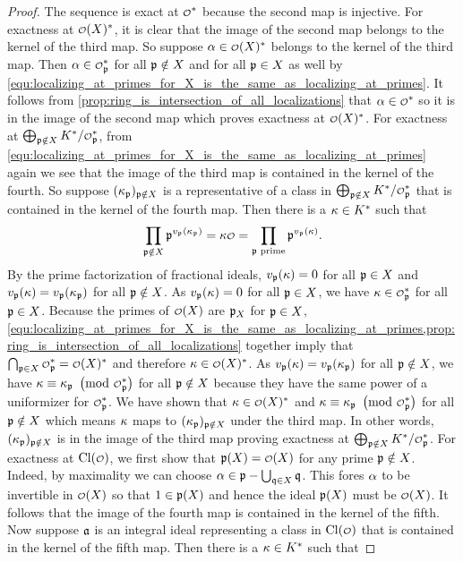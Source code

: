     \begin{proof}
      The sequence is exact at $\smc{O}^{\ast}$ because the second map is injective. For exactness at $\smc{O}(X)^{\ast}$, it is clear that the image of the second map belongs to the kernel of the third map. So suppose $\a \in \smc{O}(X)^{\ast}$ belongs to the kernel of the third map. Then $\a \in \smc{O}_{\mf{p}}^{\ast}$ for all $\mathfrak{p} \notin X$ and for all $\mathfrak{p} \in X$ as well by \cref{equ:localizing_at_primes_for_X_is_the_same_as_localizing_at_primes}. It follows from \cref{prop:ring_is_intersection_of_all_localizations} that $\a \in \smc{O}^{\ast}$ so it is in the image of the second map which proves exactness at $\smc{O}(X)^{\ast}$. For exactness at $\bigop_{\mf{p} \notin X}K^{\ast}/\smc{O}_{\mf{p}}^{\ast}$, from \cref{equ:localizing_at_primes_for_X_is_the_same_as_localizing_at_primes} again we see that the image of the third map is contained in the kernel of the fourth. So suppose $(\kappa_{\mathfrak{p}})_{\mathfrak{p} \notin X}$ is a representative of a class in $\bigop_{\mf{p} \notin X}K^{\ast}/\smc{O}_{\mf{p}}^{\ast}$ that is contained in the kernel of the fourth map. Then there is a $\kappa \in K^{\ast}$ such that
      \[
        \prod_{\mf{p} \notin X}\mf{p}^{v_{\mf{p}}(\k_{\mf{p}})} = \k\smc{O} = \prod_{\text{$\mf{p}$ prime}}\mf{p}^{v_{\mf{p}}(\k)}.
      \]
      By the prime factorization of fractional ideals, $v_{\mathfrak{p}}(\kappa) = 0$ for all $\mathfrak{p} \in X$ and $v_{\mathfrak{p}}(\kappa) = v_{\mathfrak{p}}(\kappa_{\mathfrak{p}})$ for all $\mathfrak{p} \notin X$. As $v_{\mathfrak{p}}(\kappa) = 0$ for all $\mathfrak{p} \in X$, we have $\k \in \smc{O}_{\mf{p}}^{\ast}$ for all $\mathfrak{p} \in X$. Because the primes of $\smc{O}(X)$ are $\mathfrak{p}_{X}$ for $\mathfrak{p} \in X$, \cref{equ:localizing_at_primes_for_X_is_the_same_as_localizing_at_primes,prop:ring_is_intersection_of_all_localizations} together imply that $\bigcap_{\mf{p} \in X}\smc{O}_{\mf{p}}^{\ast} = \smc{O}(X)^{\ast}$ and therefore $\k \in \smc{O}(X)^{\ast}$. As $v_{\mathfrak{p}}(\kappa) = v_{\mathfrak{p}}(\kappa_{\mathfrak{p}})$ for all $\mathfrak{p} \notin X$, we have $\k \equiv \k_{\mf{p}} \tmod{\smc{O}_{\mf{p}}^{\ast}}$ for all $\mathfrak{p} \notin X$ because they have the same power of a uniformizer for $\smc{O}_{\mf{p}}^{\ast}$. We have shown that $\k \in \smc{O}(X)^{\ast}$ and $\k \equiv \k_{\mf{p}} \tmod{\smc{O}_{\mf{p}}^{\ast}}$ for all $\mathfrak{p} \notin X$ which means $\kappa$ maps to $(\kappa_{\mathfrak{p}})_{\mathfrak{p} \notin X}$ under the third map. In other words, $(\kappa_{\mathfrak{p}})_{\mathfrak{p} \notin X}$ is in the image of the third map proving exactness at $\bigop_{\mf{p} \notin X}K^{\ast}/\smc{O}_{\mf{p}}^{\ast}$. For exactness at $\Cl(\smc{O})$, we first show that $\mf{p}(X) = \smc{O}(X)$ for any prime $\mathfrak{p} \notin X$. Indeed, by maximality we can choose $\alpha \in \mathfrak{p}-\bigcup_{\mathfrak{q} \in X}\mathfrak{q}$. This fores $\alpha$ to be invertible in $\smc{O}(X)$ so that $1 \in \mathfrak{p}(X)$ and hence the ideal $\mathfrak{p}(X)$ must be $\smc{O}(X)$. It follows that the image of the fourth map is contained in the kernel of the fifth. Now suppose $\mathfrak{a}$ is an integral ideal representing a class in $\Cl(\smc{O})$ that is contained in the kernel of the fifth map. Then there is a $\kappa \in K^{\ast}$ such that

\end{proof}
